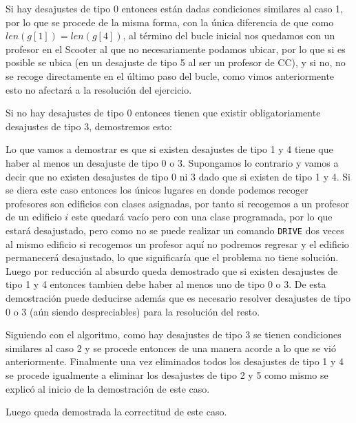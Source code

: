 \documentclass[11pt]{article}
\begin{document}
    Si hay desajustes de tipo 0 entonces están dadas condiciones similares al caso 1, por lo que se procede de la misma forma,
    con la única diferencia de que como $len(g[1]) = len(g[4])$, al término del bucle inicial nos quedamos con un profesor en
    el Scooter al que no necesariamente podamos ubicar, por lo que si es posible se ubica (en un desajuste de tipo 5 al ser un
    profesor de CC), y si no, no se recoge directamente en el último paso del bucle, como vimos anteriormente esto no afectará
    a la resolución del ejercicio.

    Si no hay desajustes de tipo 0 entonces tienen que existir obligatoriamente desajustes de tipo 3, demostremos esto:

    Lo que vamos a demostrar es que si existen desajustes de tipo 1 y 4 tiene que haber al menos un desajuste de tipo 0 o 3.
    Supongamos lo contrario y vamos a decir que no existen desajustes de tipo 0 ni 3 dado que si existen de tipo 1 y 4. Si se
    diera este caso entonces los únicos lugares en donde podemos recoger profesores son edificios con clases asignadas, por tanto
    si recogemos a un profesor de un edificio $i$ este quedará vacío pero con una clase programada, por lo que estará desajustado,
    pero como no se puede realizar un comando \texttt{DRIVE} dos veces al mismo edificio si recogemos un profesor aquí no podremos
    regresar y el edificio permanecerá desajustado, lo que significaría que el problema no tiene solución. Luego por reducción al
    absurdo queda demostrado que si existen desajustes de tipo 1 y 4 entonces tambien debe haber al menos uno de tipo 0 o 3. De esta 
    demostración puede deducirse además que es necesario resolver desajustes de tipo 0 o 3 (aún siendo despreciables) para la 
    resolución del resto.

    Siguiendo con el algoritmo, como hay desajustes de tipo 3 se tienen condiciones similares al caso 2 y se procede entonces de
    una manera acorde a lo que se vió anteriormente. Finalmente una vez eliminados todos los desajustes de tipo 1 y 4 se procede
    igualmente a eliminar los desajustes de tipo 2 y 5 como mismo se explicó al inicio de la demostración de este caso.

    Luego queda demostrada la correctitud de este caso.
\end{document}
